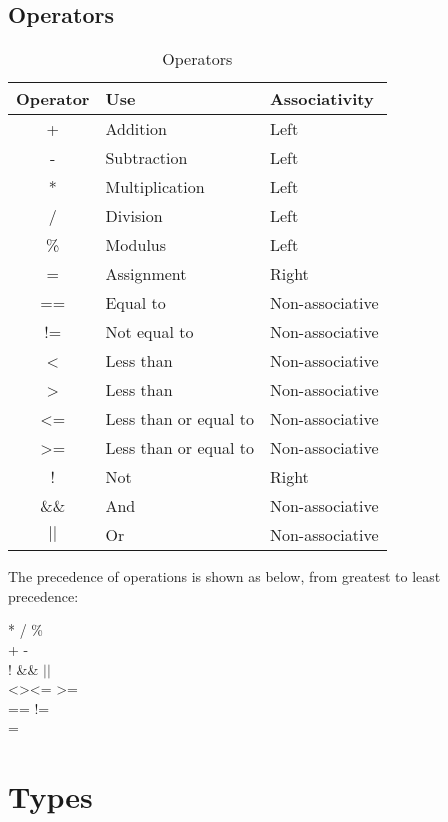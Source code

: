 \documentclass[a4paper]{article}
\begin{document}
\subsection{Operators}

\begin{table}[H]
\centering
\begin{tabular}{|c|l|l|}
\hline
Operator & Use & Associativity\\
\hline
+ & Addition & Left\\
\hline
- & Subtraction & Left \\
\hline
* & Multiplication & Left\\
\hline
/ & Division & Left \\
\hline
\% & Modulus & Left \\
\hline
= & Assignment & Right \\
\hline 
== & Equal to & Non-associative\\
\hline
!= & Not equal to & Non-associative\\
\hline 
\textless & Less than & Non-associative\\
\hline 
\textgreater & Less than & Non-associative\\
\hline 
\textless= & Less than or equal to & Non-associative\\
\hline 
\textgreater= & Less than or equal to & Non-associative\\
\hline 
! & Not & Right\\
\hline
\&\& & And & Non-associative\\
\hline
$||$ & Or & Non-associative\\
\hline
\end{tabular}
\caption{Operators}
\end{table}

The precedence of operations is shown as below, from greatest to least precedence: 
\begin{center}

\selectfont
* / \% \\
+ - \\ 
! \&\& $||$ \\
\textless \quad  \textgreater \quad \textless= \quad \textgreater= \\
== \quad !=\\
=\\ 
\end{center}


\section{Types}
\end{document}
